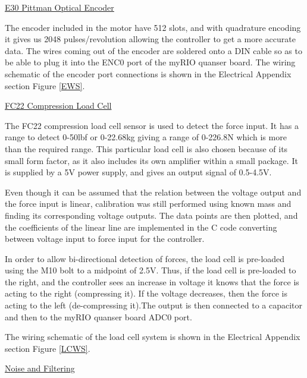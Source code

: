\vspace{.167in}
\noindent\underline{E30 Pittman Optical Encoder}\par
\vspace{.08in}
The encoder included in the motor have 512 slots, and with quadrature encoding it gives us 2048 pulses/revolution allowing the controller to get a more accurate data. The wires coming out of the encoder are soldered onto a DIN cable so as to be able to plug it into the ENC0 port of the myRIO quanser board. The wiring schematic of the encoder port connections is shown in the Electrical Appendix section Figure \ref{EWS}. \par 
\vspace{.167in}
\noindent\underline{FC22 Compression Load Cell}\par
\vspace{.08in}
The FC22 compression load cell sensor is used to detect the force input. It has a range to detect 0-50lbf or 0-22.68kg giving a range of 0-226.8N which is more than the required range. This particular load cell is also chosen because of its small form factor, as it also includes its own amplifier within a small package. It is supplied by a 5V power supply, and gives an output signal of 0.5-4.5V. \par
Even though it can be assumed that the relation between the voltage output and the force input is linear, calibration was still performed using known mass and finding its corresponding voltage outputs. The data points are then plotted, and the coefficients of the linear line are implemented in the C code converting between voltage input to force input for the controller. \par
In order to allow bi-directional detection of forces, the load cell is pre-loaded using the M10 bolt to a midpoint of 2.5V. Thus, if the load cell is pre-loaded to the right, and the controller sees an increase in voltage it knows that the force is acting to the right (compressing it). If the voltage decreases, then the force is acting to the left (de-compressing it).The output is then connected to a capacitor and then to the myRIO quanser board ADC0 port. \par
The wiring schematic of the load cell system is shown in the Electrical Appendix section Figure \ref{LCWS}. \par
\vspace{.167in}
\noindent\underline{Noise and Filtering}\par
\vspace{.08in}
